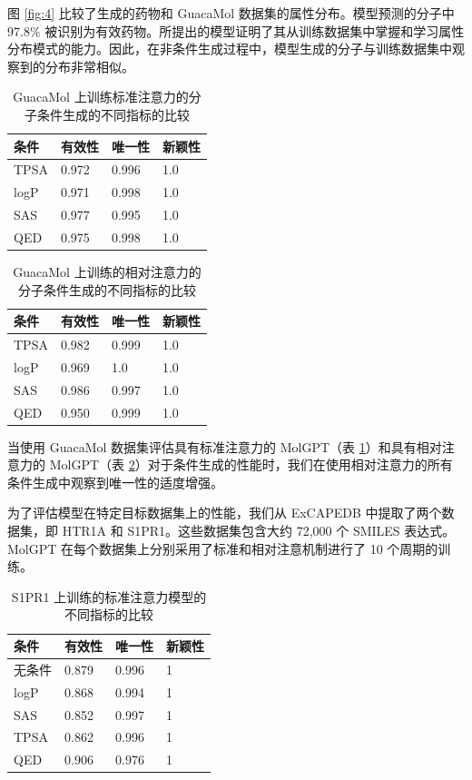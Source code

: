 \begin{translation}
图 \ref{fig:4} 比较了生成的药物和 GuacaMol 数据集的属性分布。模型预测的分子中 97.8\% 被识别为有效药物。所提出的模型证明了其从训练数据集中掌握和学习属性分布模式的能力。因此，在非条件生成过程中，模型生成的分子与训练数据集中观察到的分布非常相似。

\begin{table}[H]
  \centering
  \caption{GuacaMol 上训练标准注意力的分子条件生成的不同指标的比较}
  \label{tab:3}
  \begin{tabular}{llll}
    \hline 条件   & 有效性   & 唯一性   & 新颖性 \\
    \hline TPSA & 0.972 & 0.996 & 1.0 \\
    logP        & 0.971 & 0.998 & 1.0 \\
    SAS         & 0.977 & 0.995 & 1.0 \\
    QED         & 0.975 & 0.998 & 1.0 \\
    \hline
  \end{tabular}
\end{table}

\begin{table}[H]
  \centering
  \caption{GuacaMol 上训练的相对注意力的分子条件生成的不同指标的比较}
  \label{tab:4}
  \begin{tabular}{llll}
    \hline 条件   & 有效性   & 唯一性   & 新颖性 \\
    \hline TPSA & 0.982 & 0.999 & 1.0 \\
    logP        & 0.969 & 1.0   & 1.0 \\
    SAS         & 0.986 & 0.997 & 1.0 \\
    QED         & 0.950 & 0.999 & 1.0 \\
    \hline
  \end{tabular}
\end{table}

当使用 GuacaMol 数据集评估具有标准注意力的 MolGPT（表 \ref{tab:3}）和具有相对注意力的 MolGPT（表 \ref{tab:4}）对于条件生成的性能时，我们在使用相对注意力的所有条件生成中观察到唯一性的适度增强。

为了评估模型在特定目标数据集上的性能，我们从 ExCAPEDB 中提取了两个数据集，即 HTR1A 和 S1PR1。这些数据集包含大约 72,000 个 SMILES 表达式。 MolGPT 在每个数据集上分别采用了标准和相对注意机制进行了 10 个周期的训练。

\begin{table}[H]
  \centering
  \caption{S1PR1 上训练的标准注意力模型的不同指标的比较}
  \label{tab:5}
  \begin{tabular}{llll}
    \hline 条件  & 有效性   & 唯一性   & 新颖性 \\
    \hline 无条件 & 0.879 & 0.996 & 1   \\
    logP       & 0.868 & 0.994 & 1   \\
    SAS        & 0.852 & 0.997 & 1   \\
    TPSA       & 0.862 & 0.996 & 1   \\
    QED        & 0.906 & 0.976 & 1   \\
    \hline
  \end{tabular}
\end{table}



\end{translation}
